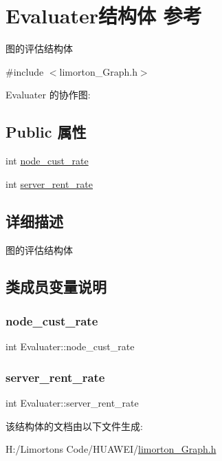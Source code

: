 \hypertarget{struct_evaluater}{}\section{Evaluater结构体 参考}
\label{struct_evaluater}


图的评估结构体  




{\ttfamily \#include $<$limorton\+\_\+\+Graph.\+h$>$}



Evaluater 的协作图\+:
\subsection*{Public 属性}
\begin{DoxyCompactItemize}
\item 
int \hyperlink{struct_evaluater_a411d7503428054a866a60f1d2b51ef19}{node\+\_\+cust\+\_\+rate}
\item 
int \hyperlink{struct_evaluater_aa007ba5b692e8e16f6b3627abf9c2ba7}{server\+\_\+rent\+\_\+rate}
\end{DoxyCompactItemize}


\subsection{详细描述}
图的评估结构体 

\subsection{类成员变量说明}
\mbox{\label{struct_evaluater_a411d7503428054a866a60f1d2b51ef19}} 
\subsubsection{\texorpdfstring{node\+\_\+cust\+\_\+rate}{node\_cust\_rate}}
{\footnotesize\ttfamily int Evaluater\+::node\+\_\+cust\+\_\+rate}

\mbox{\label{struct_evaluater_aa007ba5b692e8e16f6b3627abf9c2ba7}} 
\subsubsection{\texorpdfstring{server\+\_\+rent\+\_\+rate}{server\_rent\_rate}}
{\footnotesize\ttfamily int Evaluater\+::server\+\_\+rent\+\_\+rate}



该结构体的文档由以下文件生成\+:\begin{DoxyCompactItemize}
\item 
H\+:/\+Limorton\textquotesingle{}s Code/\+H\+U\+A\+W\+E\+I/\hyperlink{limorton___graph_8h}{limorton\+\_\+\+Graph.\+h}\end{DoxyCompactItemize}
